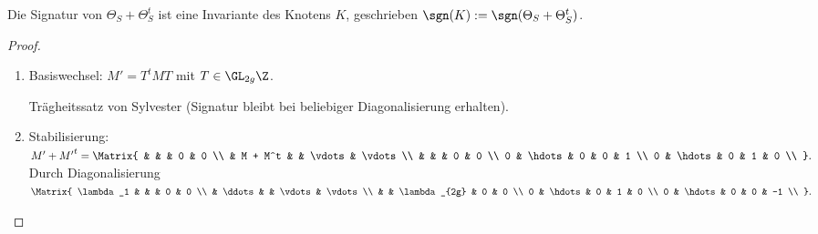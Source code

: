 \begin{prop}
    Die Signatur von $\Theta_S + \Theta_S^t$ ist eine Invariante des Knotens $K$, geschrieben $\sgn(K) := \sgn(\Theta_S + \Theta_S^t)$.
    \begin{proof}
        \begin{enumerate}[1)]
            \item
                Basiswechsel: $M' = T^t M T$ mit $T \in \GL_{2g} \Z$.

                Trägheitssatz von Sylvester (Signatur bleibt bei beliebiger Diagonalisierung erhalten).
            \item
                Stabilisierung:
                \begin{math}
                    M' + {M'}^t =
                    \Matrix{
                        &  &   & 0 & 0 \\
                        & M + M^t & & \vdots & \vdots \\
                        & & & 0 & 0 \\
                        0 & \hdots & 0 & 0 & 1 \\
                        0 & \hdots & 0 & 1 & 0 \\
                    }.
                \end{math}
                Durch Diagonalisierung
                \begin{math}
                    \Matrix{
                        \lambda_1 &  &  & 0 & 0 \\
                        & \ddots & & \vdots & \vdots \\
                        & & \lambda_{2g} & 0 & 0 \\
                        0 & \hdots & 0 & 1 & 0 \\
                        0 & \hdots & 0 & 0 & -1 \\
                    }.
                \end{math}
        \end{enumerate}
    \end{proof}
\end{prop}



